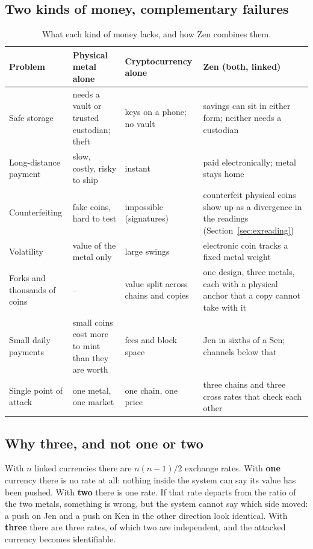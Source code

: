 \subsection{Two kinds of money, complementary failures}

\begin{table}[htbp]
\centering\small
\begin{tabularx}{\textwidth}{l Y Y Y}
\toprule
\textbf{Problem} & \textbf{Physical metal alone} & \textbf{Cryptocurrency alone} & \textbf{Zen (both, linked)}\\
\midrule
Safe storage & needs a vault or trusted custodian; theft & keys on a phone; no vault & savings can sit in either form; neither needs a custodian\\
Long-distance payment & slow, costly, risky to ship & instant & paid electronically; metal stays home\\
Counterfeiting & fake coins, hard to test & impossible (signatures) & counterfeit physical coins show up as a divergence in the readings (Section~\ref{sec:exreading})\\
Volatility & value of the metal only & large swings & electronic coin tracks a fixed metal weight\\
Forks and thousands of coins & -- & value split across chains and copies & one design, three metals, each with a physical anchor that a copy cannot take with it\\
Small daily payments & small coins cost more to mint than they are worth & fees and block space & Jen in sixths of a Sen; channels below that\\
Single point of attack & one metal, one market & one chain, one price & three chains and three cross rates that check each other\\
\bottomrule
\end{tabularx}
\caption{What each kind of money lacks, and how Zen combines them.}
\label{tab:complement}
\end{table}

\subsection{Why three, and not one or two}
With $n$ linked currencies there are $n(n-1)/2$ exchange rates. With \textbf{one} currency there is no rate at all: nothing inside the system can say its value has been pushed. With \textbf{two} there is one rate. If that rate departs from the ratio of the two metals, something is wrong, but the system cannot say which side moved: a push on Jen and a push on Ken in the other direction look identical. With \textbf{three} there are three rates, of which two are independent, and the attacked currency becomes identifiable.

